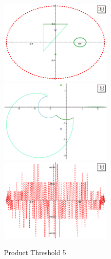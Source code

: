 \documentclass[a4paper,10pt]{article}
\begin{document}
\graphicspath{{./GE1LE0PT5/}}
\begin{figure}
\caption{Product Threshold 5}
\includegraphics[width=0.5\textwidth]{circle_plot.eps}
\includegraphics[width=0.5\textwidth]{zedplot.eps}
\includegraphics[width=0.5\textwidth]{zedplot_C0.eps}
\end{figure}


\newpage 
\clearpage
\end{document}
